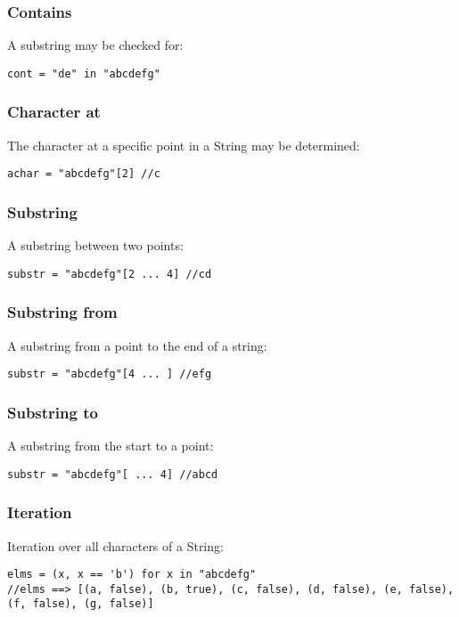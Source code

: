 \documentclass[conc-doc]{subfiles}
\begin{document}
\subsubsection{Contains}
A substring may be checked for:
\begin{lstlisting}
cont = "de" in "abcdefg"
\end{lstlisting}

\subsubsection{Character at}
The character at a specific point in a String may be determined:
\begin{lstlisting}
achar = "abcdefg"[2] //c
\end{lstlisting}

\subsubsection{Substring}
A substring between two points:
\begin{lstlisting}
substr = "abcdefg"[2 ... 4] //cd
\end{lstlisting}

\subsubsection{Substring from}
A substring from a point to the end of a string:
\begin{lstlisting}
substr = "abcdefg"[4 ... ] //efg
\end{lstlisting}


\subsubsection{Substring to}
A substring from the start to a point:
\begin{lstlisting}
substr = "abcdefg"[ ... 4] //abcd
\end{lstlisting}


\subsubsection{Iteration}
Iteration over all characters of a String:
\begin{lstlisting}
elms = (x, x == 'b') for x in "abcdefg"
//elms ==> [(a, false), (b, true), (c, false), (d, false), (e, false), (f, false), (g, false)]
\end{lstlisting}
\end{document}
